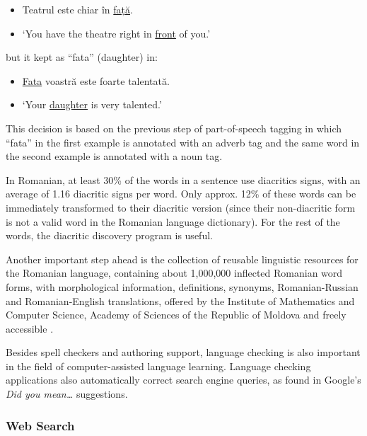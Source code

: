 \documentclass[]{../../metanetpaper}
\begin{document}
\begin{multicols}{2}
\begin{example}
\begin{itemize}
\item []Teatrul este chiar în \underline{față}.
\item []`You have the theatre right in \underline{front} of you.'
\end{itemize}
\end{example}

but it kept as “fata” (daughter) in:

\begin{example}
\begin{itemize}
\item []\underline{Fata} voastră este foarte talentată. 
\item []`Your \underline{daughter} is very talented.'
\end{itemize}
\end{example}

This decision is based on the previous step of part-of-speech tagging in which “fata” in the first example is annotated with an adverb tag and the same word in the second example is annotated with a noun tag.

In Romanian, at least 30\% of the words in a sentence use diacritics signs, with an average of 1.16 diacritic signs per word. Only approx. 12\% of these words can be immediately transformed to their diacritic version (since their non-diacritic form is not a valid word in the Romanian language dictionary). For the rest of the words, the diacritic discovery program is useful.

Another important step ahead is the collection of reusable linguistic resources for the Romanian language, containing about 1,000,000 inflected Romanian word forms, with morphological information, definitions, synonyms, Romanian-Russian and Romanian-English  translations, offered by the Institute of Mathematics and Computer Science, Academy of Sciences of the Republic of Moldova and freely accessible \cite{elrr}.

Besides spell checkers and authoring support, language checking is also important in the field of computer-assisted language learning. Language checking applications also automatically correct search engine queries, as found in Google's \textit{Did you mean…} suggestions.

\subsubsection{Web Search}


\end{multicols}
\end{document}
